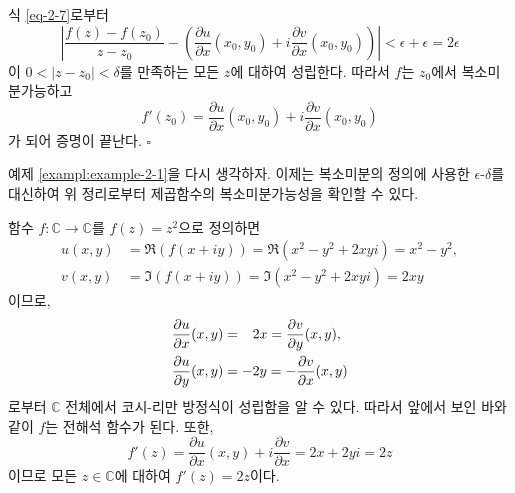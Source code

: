 식 \eqref{eq-2-7}로부터
\[
\left| \dfrac{f(z)-f(z_0)}{z-z_0} 
- \left( \dfrac{\partial u}{\partial x}(x_0,y_0) 
+ i \dfrac{\partial v}{\partial x}(x_0,y_0) \right) \right|
< \epsilon + \epsilon = 2\epsilon
\]
이 $0<|z-z_0|<\delta$를 만족하는 모든 $z$에 대하여 성립한다.
따라서 $f$는 $z_0$에서 복소미분가능하고
\[
f'(z_0) = \dfrac{\partial u}{\partial x}(x_0,y_0) 
+ i \dfrac{\partial v}{\partial x}(x_0,y_0) 
\]
가 되어 증명이 끝난다.
\hfill $\square$

예제 \ref{exampl:example-2-1}을 다시 생각하자.
이제는 복소미분의 정의에 사용한 $\epsilon$-$\delta$를 대신하여
위 정리로부터 제곱함수의 복소미분가능성을 확인할 수 있다.

\begin{saltexample}[label=example-2-7]{}{}
함수  $f:\mathbb C \to \mathbb C$를 $f(z) = z^2$으로 정의하면
\begin{align*}
u(x,y) &= \Re(f(x+iy)) = \Re(x^2-y^2+2xyi) = x^2-y^2, \\
v(x,y) &= \Im(f(x+iy)) = \Im(x^2-y^2+2xyi) = 2xy
\end{align*}
이므로, 
\begin{align*}
\dfrac{\partial u}{\partial x}(x,y) &= \hphantom{-}2x = \dfrac{\partial v}{\partial y}(x,y), \\
\dfrac{\partial u}{\partial y}(x,y) & =-2y = - \dfrac{\partial v}{\partial x}(x,y)
\end{align*}
로부터 $\mathbb C$ 전체에서 코시-리만 방정식이 성립함을 알 수 있다.
따라서 앞에서 보인 바와 같이 $f$는 전해석 함수가 된다.
또한, 
\[
f'(z) = \dfrac{\partial u}{\partial x}(x,y) + i\dfrac{\partial v}{\partial x}
= 2x + 2yi = 2z
\]
이므로 모든 $z\in\mathbb C$에 대하여 $f'(z) = 2z$이다.
\end{saltexample}

